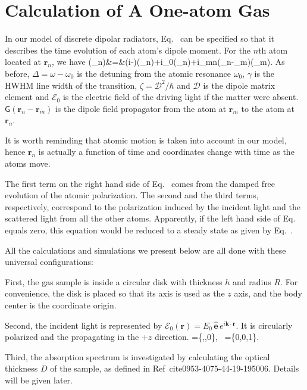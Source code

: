 \section{Calculation of A One-atom Gas}
In our model of discrete dipolar radiators, Eq.~ can be specified so that it describes the time evolution of each atom's dipole moment. For the $n$th atom located at $\mathbf{r}_n$, we have
\bea
{}(_n)&=&(i\Delta-\gamma)(_n)+i\zeta{}_0(_n)+i\zeta\sum_{m\neq n}(_n-_m)(_m).
\label{DIPOLEEQ}
\eea
As before, $\Delta=\omega-\omega_0$ is the detuning from the atomic resonance $\omega_0$, $\gamma$ is the HWHM line width of the transition, $\zeta=\mathcal{D}^2/\hbar$ and $\mathcal{D}$ is the dipole matrix element and $\mathbf{\mathcal{E}}_0$ is the electric field of the driving light if the matter were absent. $\mathsf{G}(\mathbf{r}_n-\mathbf{r}_m)$ is the dipole field propagator from the atom at $\mathbf{r}_m$ to the atom at $\mathbf{r}_n$.

It is worth reminding that atomic motion is taken into account in our model, hence $\mathbf{r}_n$ is actually a function of time and coordinates change with time as the atoms move.

The first term on the right hand side of Eq.~ comes from the damped free evolution of the atomic polarization. The second and the third terms, respectively, correspond to the polarization induced by the incident light and the scattered light from all the other atoms. Apparently, if the left hand side of Eq.~ equals zero, this equation would be reduced to a steady state as given by Eq.~.

All the calculations and simulations we present below are all done with these universal configurations:


First, the gas sample is inside a circular disk with thickness $h$ and radius $R$. For convenience, the disk is placed so that its axis is used as the $z$ axis, and the body center is the coordinate origin.

Second, the incident light is represented by $\mathcal{E}_0(\mathbf{r})=E_0\,\hat{\mathbf{e}}\,e^{i\mathbf{k}\cdot\mathbf{r}}$. It is circularly polarized and the propagating in the $+z$ direction.
\bea
{}=\{,,0\}, \, =\{0,0,1\}.
\eea

Third, the absorption spectrum is investigated by calculating the optical thickness $D$ of the sample, as defined in Ref~cite{0953-4075-44-19-195006}. Details will be given later.

